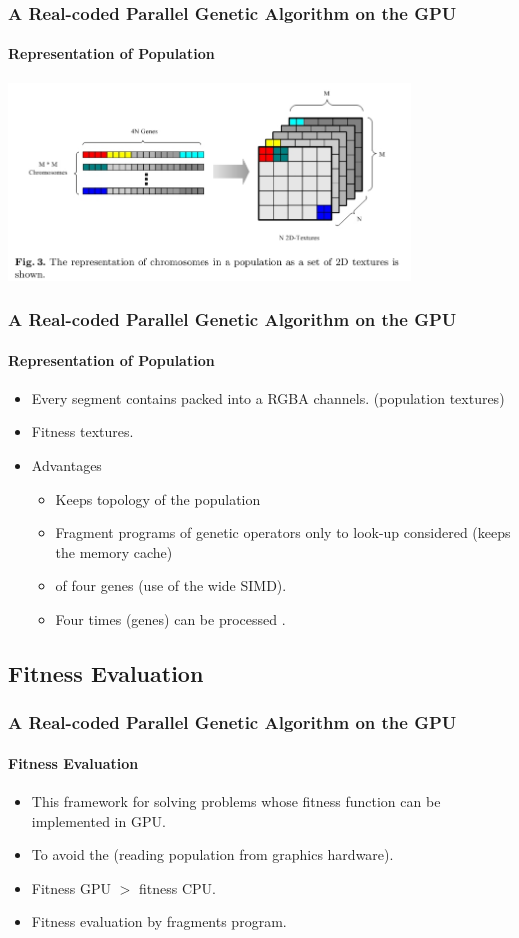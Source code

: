 \frame
{
\frametitle{A Real-coded Parallel Genetic Algorithm on the GPU}
\framesubtitle{Representation of Population}
\begin{center}
	\includegraphics[width=0.8\textwidth]{img/representation}
\end{center}
}

\frame
{
\frametitle{A Real-coded Parallel Genetic Algorithm on the GPU}
\framesubtitle{Representation of Population}
\begin{itemize}
	\item Every segment contains  packed into a  RGBA channels. (population textures)
	\item Fitness textures.
	\item Advantages
	\begin{itemize}
		\item Keeps  topology of the population
		\item Fragment programs of genetic operators only  to look-up considered  (keeps the memory cache)
		\item {} of four genes (use of the wide SIMD).
		\item Four times (genes) can be processed .
	\end{itemize}
\end{itemize}
}

\subsection{Fitness Evaluation}
\frame
{
\frametitle{A Real-coded Parallel Genetic Algorithm on the GPU}
\framesubtitle{Fitness Evaluation}
\begin{itemize}
	\item This framework  for solving problems whose fitness function can be implemented  in GPU.
	\item To avoid the  (reading population from graphics hardware).
	\item Fitness GPU $>$ fitness CPU.
	\item Fitness evaluation by fragments program. 
\end{itemize}
}
